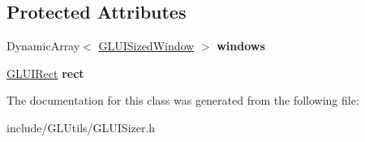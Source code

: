 \subsection*{Protected Attributes}
\begin{DoxyCompactItemize}
\item 
\hypertarget{classCartWheel_1_1GL_1_1GLUISizer_aa13621232d1f5ce7b0055dc8e2d99d11}{
DynamicArray$<$ \hyperlink{classCartWheel_1_1GL_1_1GLUISizedWindow}{GLUISizedWindow} $>$ {\bfseries windows}}
\label{classCartWheel_1_1GL_1_1GLUISizer_aa13621232d1f5ce7b0055dc8e2d99d11}

\item 
\hypertarget{classCartWheel_1_1GL_1_1GLUISizer_a7fe16cee8ff5ee639557f1e4c3a378ce}{
\hyperlink{classCartWheel_1_1GL_1_1GLUIRect}{GLUIRect} {\bfseries rect}}
\label{classCartWheel_1_1GL_1_1GLUISizer_a7fe16cee8ff5ee639557f1e4c3a378ce}

\end{DoxyCompactItemize}


The documentation for this class was generated from the following file:\begin{DoxyCompactItemize}
\item 
include/GLUtils/GLUISizer.h\end{DoxyCompactItemize}
